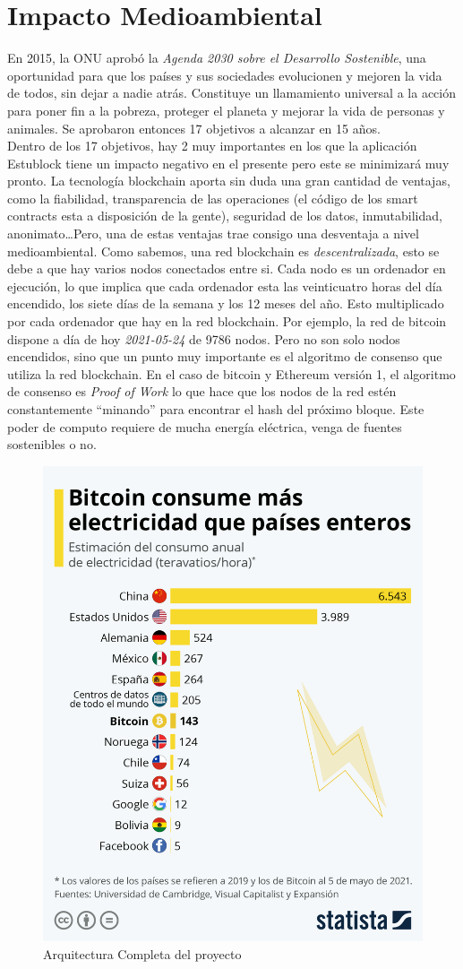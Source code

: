 \chapter{Impacto Medioambiental}
\label{cap:ImpactoMedioAmbiente}

En 2015, la ONU aprobó la \emph{Agenda 2030 sobre el Desarrollo Sostenible}\cite{agenda2030}, una oportunidad para que los países y sus sociedades evolucionen y mejoren la vida de todos, sin dejar a nadie atrás. Constituye un llamamiento universal a la acción para poner fin a la pobreza, proteger el planeta y mejorar la vida de personas y animales. Se aprobaron entonces 17 objetivos\cite{17objetivos} a alcanzar en 15 años. \\

Dentro de los 17 objetivos, hay 2 muy importantes en los que la aplicación Estublock tiene un impacto negativo en el presente pero este se minimizará muy pronto. La tecnología blockchain aporta sin duda una gran cantidad de ventajas, como la fiabilidad, transparencia de las operaciones (el código de los smart contracts esta a disposición de la gente), seguridad de los datos, inmutabilidad, anonimato\dots Pero, una de estas ventajas trae consigo una desventaja a nivel medioambiental. Como sabemos, una red blockchain es \emph{descentralizada}, esto se debe a que hay varios nodos conectados entre si. Cada nodo es un ordenador en ejecución, lo que implica que cada ordenador esta las veinticuatro horas del día encendido, los siete días de la semana y los 12 meses del año. Esto multiplicado por cada ordenador que hay en la red blockchain. Por ejemplo, la red de bitcoin dispone a día de hoy \textit{2021-05-24} de 9786 nodos\cite{bitcoinNodos}. Pero no son solo nodos encendidos, sino que un punto muy importante es el algoritmo de consenso que utiliza la red blockchain. En el caso de bitcoin y Ethereum versión 1, el algoritmo de consenso es \emph{Proof of Work} lo que hace que los nodos de la red estén constantemente ``minando'' para encontrar el hash del próximo bloque. Este poder de computo requiere de mucha energía eléctrica, venga de fuentes sostenibles o no. \\

\begin{figure}[h!]
  \centering
  \includegraphics[width=0.4\linewidth]{figs/ImpactoMedioAmbiente/electricidad_bitcoin}
  \caption[Arquitectura]{Arquitectura Completa del proyecto}
  \label{fig:estublockArch}
\end{figure}

